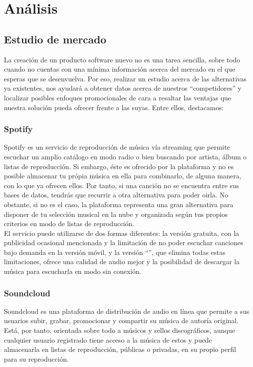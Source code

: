 \chapter{Análisis}
\label{cap:analisis}

\section{Estudio de mercado}

La creación de un producto software nuevo no es una tarea sencilla, sobre todo cuando no cuentas con una mínima información acerca del mercado en el que esperas que se desenvuelva. Por eso, realizar un estudio acerca de las alternativas ya existentes, nos ayudará a obtener datos acerca de nuestros ``competidores'' y localizar posibles enfoques promocionales de cara a resaltar las ventajas que nuestra solución pueda ofrecer frente a las suyas. Entre ellos, destacamos:

\subsection{Spotify}
Spotify es un servicio de reproducción de música vía streaming que permite escuchar un amplio catálogo en modo radio o bien buscando por artista, álbum o listas de reproducción. Si embargo, éste es ofrecido por la plataforma y no es posible almacenar tu própia música en ella para combinarlo, de alguna manera, con lo que ya ofrecen ellos. Por tanto, si una canción no se encuentra entre sus bases de datos, tendrás que recurrir a otra alternativa para poder oirla. No obstante, si no es el caso, la plataforma representa una gran alternativa para disponer de tu selección musical en la nube y organizada según tus propios criterios en modo de listas de reproducción.\\

El servicio puede utilizarse de dos formas diferentes: la versión gratuita, con la publicidad ocasional mencionada y la limitación de no poder escuchar canciones bajo demanda en la versión móvil, y la versión ``'', que elimina todas estas limitaciones, ofrece una calidad de audio mejor y la posibilidad de descargar la música para escucharla en modo sin conexión.

\subsection{Soundcloud}
Soundcloud es una plataforma de distribución de audio en línea que permite a sus usuarios subir, grabar, promocionar y compartir su música de autoría original. Está, por tanto, orientada sobre todo a músicos y sellos discográficos, aunque cualquier usuario registrado tiene acceso a la música de estos y puede almacenarla en listas de reproducción, públicas o privadas, en su propio perfil para su reproducción.\\

